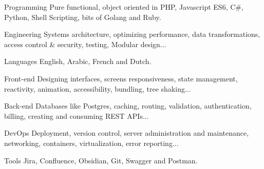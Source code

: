 

\begin{cvskills}

  \cvskill
    {Programming} %
    {Pure functional, object oriented in PHP, Javascript ES6, C\#, Python, Shell Scripting, bits of Golang and Ruby.} %


  \cvskill
    {Engineering} %
    {Systems architecture, optimizing performance, data transformations, access control \& security, testing, Modular design...} %

  \cvskill
    {Languages} %
    {English, Arabic, French and Dutch.} %

  \cvskill
    {Front-end} %
    {Designing interfaces, screens responsiveness, state management, reactivity, animation, accessibility, bundling, tree shaking...} %

  \cvskill
    {Back-end} %
    {Databases like Postgres, caching, routing, validation, authentication, billing, creating and consuming REST APIs...} %

  \cvskill
    {DevOps} %
    {Deployment, version control, server administration and maintenance, networking, containers, virtualization, error reporting...} %

  \cvskill
    {Tools} %
    {Jira, Confluence, Obsidian, Git, Swagger and Postman.} %

\end{cvskills}
